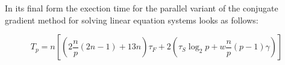 In its final form the exection time for the parallel variant of the conjugate gradient method for solving linear equation systems looks as follows:

\begin{equation}
  T_p = n \left[  \left( 2\frac{n}{p} (2n-1) + 13n \right) \tau_F + 2 (\tau_S \log_2 p + w \frac{n}{p} (p-1)\gamma) \right]
\end{equation}












